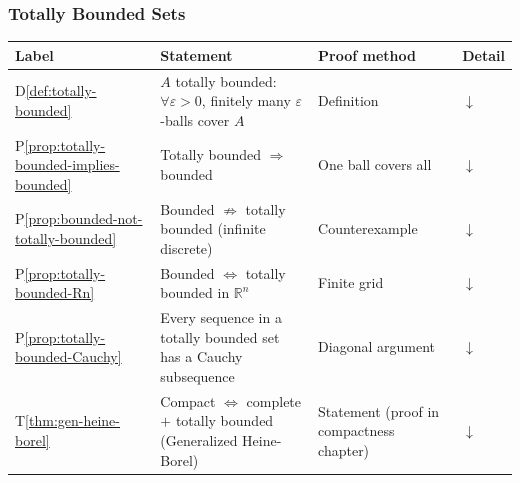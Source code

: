 %

\subsubsection{Totally Bounded Sets}
\label{sec:totally-bounded}

\begin{tcolorbox}[colback=gray!6, colframe=gray!40, arc=2pt,
  left=6pt, right=6pt, top=4pt, bottom=4pt,
  title={\small\textbf{Totally Bounded Sets --- Quick Reference}},
  fonttitle=\small\bfseries]
\small
\begin{tabular}{l l l l}
\toprule
\textbf{Label} & \textbf{Statement} & \textbf{Proof method} & \textbf{Detail} \\
\midrule
D\ref{def:totally-bounded}
  & $A$ totally bounded: $\forall\varepsilon>0$, finitely many $\varepsilon$-balls cover $A$
  & Definition
  & \hyperref[def:totally-bounded]{$\downarrow$} \\[4pt]
P\ref{prop:totally-bounded-implies-bounded}
  & Totally bounded $\Rightarrow$ bounded
  & One ball covers all
  & \hyperref[prop:totally-bounded-implies-bounded]{$\downarrow$} \\[4pt]
P\ref{prop:bounded-not-totally-bounded}
  & Bounded $\not\Rightarrow$ totally bounded (infinite discrete)
  & Counterexample
  & \hyperref[prop:bounded-not-totally-bounded]{$\downarrow$} \\[4pt]
P\ref{prop:totally-bounded-Rn}
  & Bounded $\iff$ totally bounded in $\mathbb{R}^n$
  & Finite grid
  & \hyperref[prop:totally-bounded-Rn]{$\downarrow$} \\[4pt]
P\ref{prop:totally-bounded-Cauchy}
  & Every sequence in a totally bounded set has a Cauchy subsequence
  & Diagonal argument
  & \hyperref[prop:totally-bounded-Cauchy]{$\downarrow$} \\[4pt]
T\ref{thm:gen-heine-borel}
  & Compact $\iff$ complete $+$ totally bounded (Generalized Heine-Borel)
  & Statement (proof in compactness chapter)
  & \hyperref[thm:gen-heine-borel]{$\downarrow$} \\[4pt]
\bottomrule
\end{tabular}
\end{tcolorbox}

